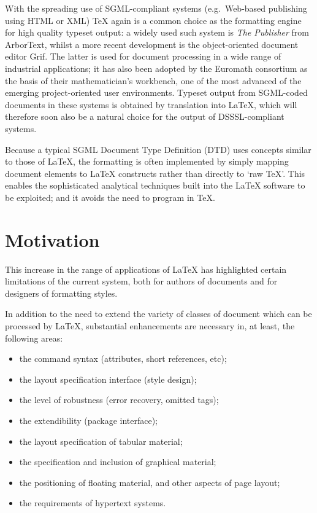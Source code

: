 \documentclass[a4paper]{article}
\newcommand{\eg}{e.g.~}
\newcommand{\SGML}{{\sc SGML}}
\newcommand{\DSSSL}{{\sc DSSSL}}
\newcommand{\HTML}{{\sc HTML}}
\newcommand{\XML}{{\sc XML}}
\begin{document}
With the spreading use of \SGML{}-compliant systems (\eg Web-based
publishing using \HTML{} or \XML{}) \TeX{} again is a common choice as
the formatting engine for high quality typeset output: a widely used
such system is {\em The Publisher\/} from ArborText, whilst a more
recent development is the object-oriented document editor Grif.  The
latter is used for document processing in a wide range of industrial
applications; it has also been adopted by the Euromath consortium as
the basis of their mathematician's workbench, one of the most advanced
of the emerging project-oriented user environments.  Typeset output
from \SGML{}-coded documents in these systems is obtained by
translation into \LaTeX{}, which will therefore soon also be a natural
choice for the output of \DSSSL-compliant systems.

Because a typical \SGML{} Document Type Definition (DTD) uses concepts
similar to those of \LaTeX{}, the formatting is often implemented by
simply mapping document elements to \LaTeX{} constructs rather than
directly to `raw \TeX'.
This enables the
sophisticated analytical techniques built into the \LaTeX{}
software to be exploited; and it avoids the need to program in \TeX{}.

\section{Motivation}

This increase in the range of applications of \LaTeX{} has highlighted
certain limitations of the current system, both for authors of
documents and for designers of formatting styles.

In addition to the need to extend the variety of classes of document
which can be processed by \LaTeX{}, substantial enhancements are
necessary in, at least, the following areas:
 \begin{itemize}
 \item
   the command syntax (attributes, short references, etc);
 \item
   the layout specification interface (style design);
 \item
   the level of robustness (error recovery, omitted tags);
 \item
   the extendibility (package interface);
 \item
   the layout specification of tabular material;
 \item
   the specification and inclusion of graphical material;
 \item
   the positioning of floating material, and other aspects of page
   layout;
 \item
   the requirements of hypertext systems.
 \end{itemize}
\end{document}
